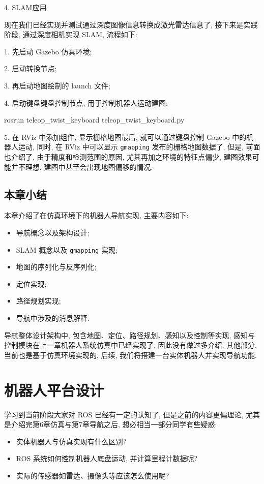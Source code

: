 \documentclass[openany, fontset=windowsold]{ctexbook}
\theoremstyle{kaiti}
\theoremstyle{normal}
\begin{document}
4. SLAM应用

现在我们已经实现并测试通过深度图像信息转换成激光雷达信息了, 接下来是实践阶段, 通过深度相机实现 SLAM, 流程如下:

1. 先启动 Gazebo 仿真环境; 

2. 启动转换节点; 

3. 再启动地图绘制的 launch 文件; 

4. 启动键盘键盘控制节点, 用于控制机器人运动建图; 

\begin{bash}
  rosrun teleop_twist_keyboard teleop_twist_keyboard.py
\end{bash}

5. 在 RViz 中添加组件, 显示栅格地图最后, 就可以通过键盘控制 Gazebo 中的机器人运动, 同时, 在 RViz 中可以显示 \verb|gmapping| 发布的栅格地图数据了, 但是, 前面也介绍了, 由于精度和检测范围的原因, 尤其再加之环境的特征点偏少, 建图效果可能并不理想, 建图中甚至会出现地图偏移的情况.

\section{本章小结}

本章介绍了在仿真环境下的机器人导航实现, 主要内容如下:

\begin{itemize}
  \item 导航概念以及架构设计;
  \item SLAM 概念以及 \verb|gmapping| 实现;
  \item 地图的序列化与反序列化;
  \item 定位实现;
  \item 路径规划实现;
  \item 导航中涉及的消息解释.
\end{itemize}

导航整体设计架构中, 包含地图、定位、路径规划、感知以及控制等实现, 感知与控制模块在上一章机器人系统仿真中已经实现了, 因此没有做过多介绍, 其他部分, 当前也是基于仿真环境实现的, 后续, 我们将搭建一台实体机器人并实现导航功能.

\chapter{机器人平台设计}
\label{chapter:robot_design}

学习到当前阶段大家对 ROS 已经有一定的认知了, 但是之前的内容更偏理论, 尤其是介绍完第6章仿真与第7章导航之后, 想必相当一部分同学有些疑惑: 

\begin{itemize}
  \item 实体机器人与仿真实现有什么区别? 
  \item ROS 系统如何控制机器人底盘运动, 并计算里程计数据呢? 
  \item 实际的传感器如雷达、摄像头等应该怎么使用呢? 
\end{itemize}
\end{document}
